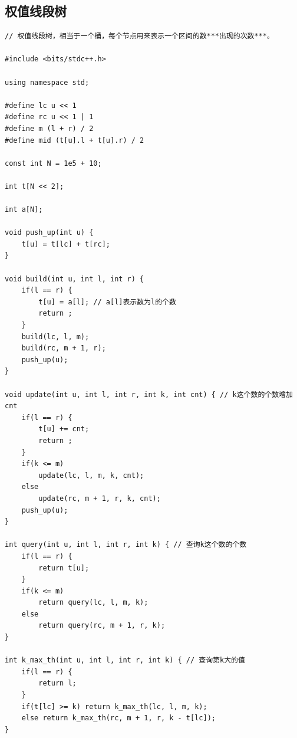 \documentclass[twoside]{article}
\begin{document}
\subsection{权值线段树}
\begin{lstlisting}
// 权值线段树，相当于一个桶，每个节点用来表示一个区间的数***出现的次数***。

#include <bits/stdc++.h>

using namespace std;

#define lc u << 1
#define rc u << 1 | 1
#define m (l + r) / 2
#define mid (t[u].l + t[u].r) / 2

const int N = 1e5 + 10;

int t[N << 2];

int a[N];

void push_up(int u) {
    t[u] = t[lc] + t[rc];
}

void build(int u, int l, int r) {
    if(l == r) {
        t[u] = a[l]; // a[l]表示数为l的个数
        return ;
    }
    build(lc, l, m);
    build(rc, m + 1, r);
    push_up(u);
}

void update(int u, int l, int r, int k, int cnt) { // k这个数的个数增加cnt
    if(l == r) {
        t[u] += cnt;
        return ;
    }
    if(k <= m)
        update(lc, l, m, k, cnt);
    else
        update(rc, m + 1, r, k, cnt);
    push_up(u); 
}

int query(int u, int l, int r, int k) { // 查询k这个数的个数
    if(l == r) {
        return t[u];
    }
    if(k <= m)
        return query(lc, l, m, k);
    else 
        return query(rc, m + 1, r, k);
}

int k_max_th(int u, int l, int r, int k) { // 查询第k大的值
    if(l == r) {
        return l;
    }
    if(t[lc] >= k) return k_max_th(lc, l, m, k);
    else return k_max_th(rc, m + 1, r, k - t[lc]);
}
\end{lstlisting}
\end{document}
